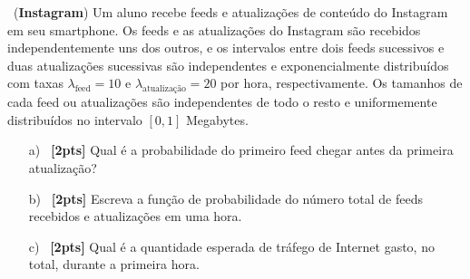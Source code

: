 \documentclass[a4paper,12pt,oneside,twocolumn]{Config/milktest}
\begin{document}
\medskip 
\question~({\bf Instagram}) Um aluno recebe feeds e atualizações de conteúdo do Instagram em seu smartphone. Os feeds e as atualizações do Instagram são recebidos independentemente uns dos outros, e os intervalos entre dois feeds sucessivos e duas atualizações sucessivas são independentes e exponencialmente distribuídos com taxas $\lambda_{\text{feed}} = 10$
e $\lambda_{\text{atualização}} = 20$ por hora, respectivamente. Os tamanhos de cada feed ou atualizações são independentes de todo o resto e uniformemente distribuídos no intervalo $[0, 1]$ Megabytes.
\begin{enumerate}
\item[a)]~\textbf{[2pts]}  Qual é a probabilidade do primeiro feed chegar antes da primeira atualização?
\item[b)]~\textbf{[2pts]} Escreva a função de probabilidade do número total de feeds recebidos e atualizações em uma hora.
\item[c)]~\textbf{[2pts]} Qual é a quantidade esperada de tráfego de Internet gasto, no total, durante a primeira hora.
\end{enumerate}

\bigskip


\centering\color{cor}{\scshape boa prova}


% 

% 

% 

% 
\end{document}
